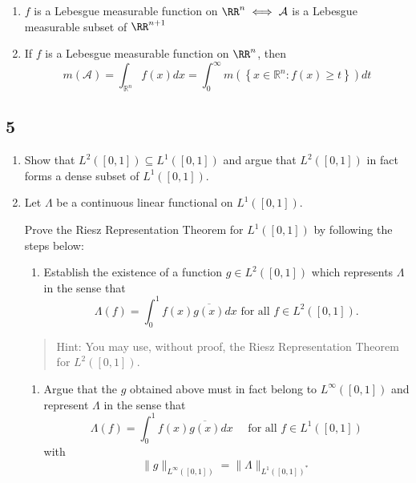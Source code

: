 \begin{enumerate}
\def\labelenumi{\alph{enumi}.}
\item
  \(f\) is a Lebesgue measurable function on \(\RR^n \iff \mathcal A\)
  is a Lebesgue measurable subset of \(\RR^{n+1}\)
\item
  If \(f\) is a Lebesgue measurable function on \(\RR^n\), then \[
    m(\mathcal{A})=\int_{\mathbb{R}^{n}} f(x) d x=\int_{0}^{\infty} m\left(\left\{x \in \mathbb{R}^{n}: f(x) \geq t\right\}\right) d t
    \]
\end{enumerate}

\hypertarget{section-4}{%
\subsection{5}\label{section-4}}

\begin{enumerate}
\def\labelenumi{\alph{enumi}.}
\item
  Show that \(L^2([0, 1]) \subseteq L^1([0, 1])\) and argue that \(L^2([0, 1])\)
  in fact forms a dense subset of \(L^1([0, 1])\).
\item
  Let \(\Lambda\) be a continuous linear functional on \(L^1([0, 1])\).

  Prove the Riesz Representation Theorem for \(L^1([0, 1])\) by
  following the steps below:

  \begin{enumerate}
  \def\labelenumii{\roman{enumii}.}
  \tightlist
  \item
    Establish the existence of a function \(g \in L^2([0, 1])\) which
    represents \(\Lambda\) in the sense that \[
      \Lambda(f ) = \int_0^1 f(x) \overline{g(x)} dx \text{ for all } f \in L^2([0, 1]).
    \]
  \end{enumerate}

  \begin{quote}
  Hint: You may use, without proof, the Riesz Representation Theorem for
  \(L^2([0, 1])\).
  \end{quote}

  \begin{enumerate}
  \def\labelenumii{\roman{enumii}.}
  \setcounter{enumii}{1}
  \tightlist
  \item
    Argue that the \(g\) obtained above must in fact belong to
    \(L^\infty([0, 1])\) and represent \(\Lambda\) in the sense that \[
    \Lambda(f)=\int_{0}^{1} f(x) \overline{g(x)} d x \quad \text { for all } f \in L^{1}([0,1])
    \] with \[
    \|g\|_{L^{\infty}([0,1])}=\|\Lambda\|_{L^{1}([0,1])^*}
    \]
  \end{enumerate}
\end{enumerate}

